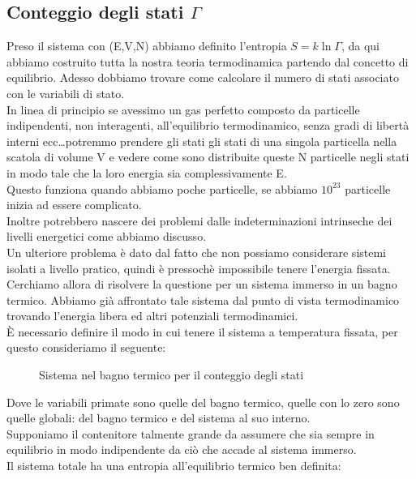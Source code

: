 \subsection{Conteggio degli stati $\Gamma$}%
Preso il sistema con (E,V,N) abbiamo definito l'entropia $S = k \ln\Gamma$, da qui abbiamo costruito tutta la nostra teoria termodinamica partendo dal concetto di equilibrio. Adesso dobbiamo trovare come calcolare il numero di stati associato con le variabili di stato.\\
In linea di principio se avessimo un gas perfetto composto da particelle indipendenti, non interagenti, all'equilibrio termodinamico, senza gradi di libertà interni ecc\ldots potremmo prendere gli stati gli stati di una singola particella nella scatola di volume V e vedere come sono distribuite queste N particelle negli stati in modo tale che la loro energia sia complessivamente E.\\
Questo funziona quando abbiamo poche particelle, se abbiamo $10^{23}$ particelle inizia ad essere complicato. \\
Inoltre potrebbero nascere dei problemi dalle indeterminazioni intrinseche dei livelli energetici come abbiamo discusso. \\
Un ulteriore problema è dato dal fatto che non possiamo considerare sistemi isolati a livello pratico, quindi è pressochè impossibile tenere l'energia fissata.\\
Cerchiamo allora di risolvere la questione per un sistema immerso in un bagno termico. Abbiamo già affrontato tale sistema dal punto di vista termodinamico trovando l'energia libera ed altri potenziali termodinamici.\\
È necessario definire il modo in cui tenere il sistema a temperatura fissata, per questo consideriamo il seguente:
\begin{figure}[H]
    \centering
    \caption{Sistema nel bagno termico per il conteggio degli stati}
    \label{fig:sistema-nel-bagno-termico-per-il-conteggio-degli-stati}
\end{figure}
\noindent
Dove le variabili primate sono quelle del bagno termico, quelle con lo zero sono quelle globali: del bagno termico e del sistema al suo interno.\\
Supponiamo il contenitore talmente grande da assumere che sia sempre in equilibrio in modo indipendente da ciò che accade al sistema immerso.\\
Il sistema totale ha una entropia all'equilibrio termico ben definita:

